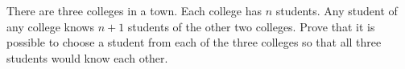 There are three colleges in a town. Each college has $n$ students. Any student of any college knows $n+1$ students of the other two colleges. Prove that it is possible to choose a student from each of the three colleges so that all three students would know each other.